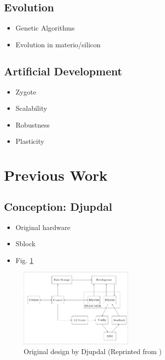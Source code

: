 \documentclass[a4paper]{IEEEtran}
\begin{document}
\subsection{Evolution}

\begin{itemize}
    \item Genetic Algorithms
    \item Evolution in materio/silicon \cite{miller2014evolution}
\end{itemize}

\subsection{Artificial Development \cite{harding2008artificial}\cite{tufte2008evodevo}}

\begin{itemize}
    \item Zygote
    \item Scalability
    \item Robustness
    \item Plasticity
\end{itemize}

\section{Previous Work}

\subsection{Conception: Djupdal \cite{djupdal2003sblock}}

\begin{itemize}
    \item Original hardware
    \item Sblock
    \item Fig. \ref{fig:ca-djupdal}
\end{itemize}

\begin{figure}[!ht]
    \centering
    \includegraphics[width=0.5\textwidth]{figures/ca-djupdal}
    \caption{Original design by Djupdal (Reprinted from \cite{stovneng2014sblock})}
    \label{fig:ca-djupdal}
\end{figure}
\end{document}
